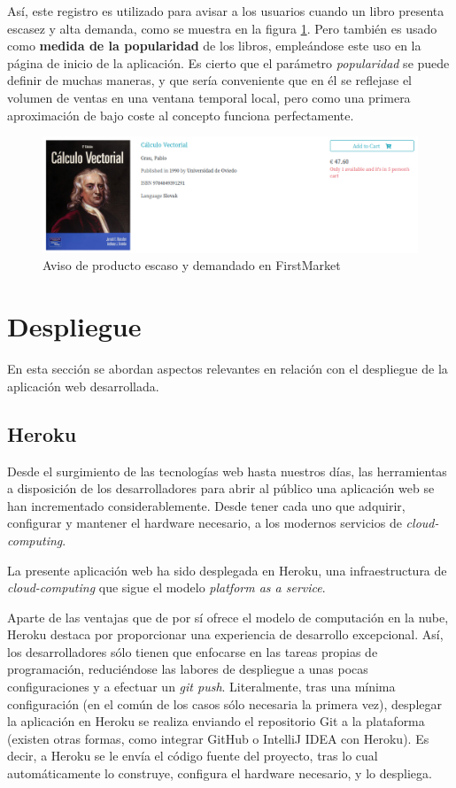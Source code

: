 \documentclass[a4paper]{article}
\begin{document}
    Así, este registro es utilizado para avisar a los usuarios cuando un libro presenta escasez y alta demanda, como se muestra en la figura \ref{fig:fm_cartBookRegistry_alert}. Pero también es usado como \textbf{medida de la popularidad} de los libros, empleándose este uso en la página de inicio de la aplicación. Es cierto que el parámetro \emph{popularidad} se puede definir de muchas maneras, y que sería conveniente que en él se reflejase el volumen de ventas en una ventana temporal local, pero como una primera aproximación de bajo coste al concepto funciona perfectamente.
    
    \begin{figure}[htb!]
    	\centering
    	\includegraphics[width=\textwidth]{fm_cartBookRegistry_alert}
    	\caption{Aviso de producto escaso y demandado en FirstMarket}
    	\label{fig:fm_cartBookRegistry_alert}
    \end{figure}
    
    \section{Despliegue} \label{sec:deployment}
    En esta sección se abordan aspectos relevantes en relación con el despliegue de la aplicación web desarrollada. 
    
    \subsection{Heroku} \label{sec:heroku}
    Desde el surgimiento de las tecnologías web hasta nuestros días, las herramientas a disposición de los desarrolladores para abrir al público una aplicación web se han incrementado considerablemente. Desde tener cada uno que adquirir, configurar y mantener el hardware necesario, a los modernos servicios de \emph{cloud-computing}.
    
    La presente aplicación web ha sido desplegada en Heroku, una infraestructura de \emph{cloud-computing} que sigue el modelo \emph{platform as a service}.
    
    Aparte de las ventajas que de por sí ofrece el modelo de computación en la nube, Heroku destaca por proporcionar una experiencia de desarrollo excepcional. Así, los desarrolladores sólo tienen que enfocarse en las tareas propias de programación, reduciéndose las labores de despliegue a unas pocas configuraciones y a efectuar un \emph{git push}. Literalmente, tras una mínima configuración (en el común de los casos sólo necesaria la primera vez), desplegar la aplicación en Heroku se realiza enviando el repositorio Git a la plataforma (existen otras formas, como integrar GitHub o IntelliJ IDEA con Heroku). Es decir, a Heroku se le envía el código fuente del proyecto, tras lo cual automáticamente lo construye, configura el hardware necesario, y lo despliega.
    
\end{document}

